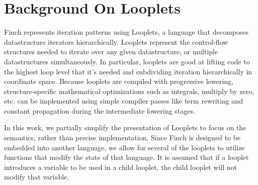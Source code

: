 \section{Background On Looplets}
Finch represents iteration patterns using Looplets, a language that decomposes
datastructure iterators hierarchically. 
%
Looplets represent the control-flow
structures needed to iterate over any given datastructure, or multiple
datastructures simultaneously. 
%
In particular, looplets are good at lifting code
to the highest loop level that it's needed and subdividing iteration
hierarchically in coordinate space.
%
Because looplets are compiled with
progressive lowering, structure-specific mathematical optimizations such as
integrals, multiply by zero, etc. can be implemented using simple compiler
passes like term rewriting and constant propagation during the intermediate
lowering stages. \cite{ahrens_looplets_2023}

In this work, we partially simplify the presentation of Looplets to focus on the
semantics, rather than precise implementation. Since Finch is designed to be
embedded into another language, we allow for several of the looplets to utilize
functions that modify the state of that language. It is assumed that if a
looplet introduces a variable to be used in a child looplet, the child looplet
will not modify that variable.

